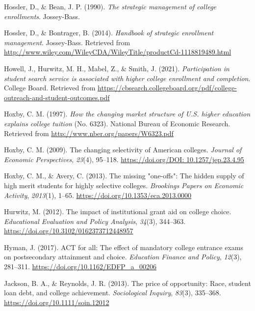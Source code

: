 \documentclass[
  12pt,
]{article}
\newlength{\cslhangindent}
\newlength{\cslentryspacingunit} %
\newenvironment{CSLReferences}[2] %
 {%
  \setlength{\parindent}{0pt}
  \ifodd #1
  \let\oldpar\par
  \def\par{\hangindent=\cslhangindent\oldpar}
  \fi
  \setlength{\parskip}{#2\cslentryspacingunit}
 }%
 {}
\begin{document}
\begin{CSLReferences}{1}{0}
\leavevmode{}%
Hossler, D., \& Bean, J. P. (1990). \emph{The strategic management of college enrollments}. Jossey-Bass.

\leavevmode{}%
Hossler, D., \& Bontrager, B. (2014). \emph{Handbook of strategic enrollment management}. Jossey-Bass. Retrieved from \url{http://www.wiley.com/WileyCDA/WileyTitle/productCd-1118819489.html}

\leavevmode{}%
Howell, J., Hurwitz, M. H., Mabel, Z., \& Smith, J. (2021). \emph{Participation in student search service is associated with higher college enrollment and completion}. College Board. Retrieved from \url{https://cbsearch.collegeboard.org/pdf/college-outreach-and-student-outcomes.pdf}

\leavevmode{}%
Hoxby, C. M. (1997). \emph{How the changing market structure of {U.S.} {higher} education explains college tuition} (No. 6323). National Bureau of Economic Research. Retrieved from \url{http://www.nber.org/papers/W6323.pdf}

\leavevmode{}%
Hoxby, C. M. (2009). The changing selectivity of {American} colleges. \emph{Journal of Economic Perspectives}, \emph{23}(4), 95--118. \href{https://doi.org/DOI:\%2010.1257/jep.23.4.95}{https://doi.org/DOI: 10.1257/jep.23.4.95}

\leavevmode{}%
Hoxby, C. M., \& Avery, C. (2013). The missing "one-offs": The hidden supply of high merit students for highly selective colleges. \emph{Brookings Papers on Economic Activity}, \emph{2013}(1), 1--65. \url{https://doi.org/10.1353/eca.2013.0000}

\leavevmode{}%
Hurwitz, M. (2012). The impact of institutional grant aid on college choice. \emph{Educational Evaluation and Policy Analysis}, \emph{34}(3), 344--363. \url{https://doi.org/10.3102/0162373712448957}

\leavevmode{}%
Hyman, J. (2017). ACT for all: The effect of mandatory college entrance exams on postsecondary attainment and choice. \emph{Education Finance and Policy}, \emph{12}(3), 281--311. \url{https://doi.org/10.1162/EDFP_a_00206}

\leavevmode{}%
Jackson, B. A., \& Reynolds, J. R. (2013). The price of opportunity: Race, student loan debt, and college achievement. \emph{Sociological Inquiry}, \emph{83}(3), 335--368. \url{https://doi.org/10.1111/soin.12012}


\end{CSLReferences}
\end{document}

